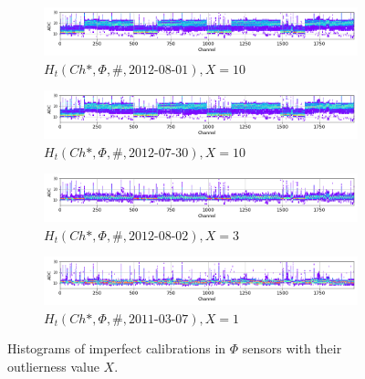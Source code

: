 \begin{figure}

    \begin{subfigure}[b]{\textwidth}
    \centering
    \includegraphics[width=0.9\linewidth]{figures/chapter4/calib_analysis/P2-all-bad-cals-phi-0.png}
    \caption{$H_t(Ch*, \Phi, \#, \text{2012-08-01}), X=10$}
    \label{plot:all-bad-phi-0}
  \end{subfigure}


    \begin{subfigure}[b]{\textwidth}
    \centering
    \includegraphics[width=0.9\linewidth]{figures/chapter4/calib_analysis/P2-all-bad-cals-phi-1.png}
    \caption{$H_t(Ch*, \Phi, \#, \text{2012-07-30}), X=10$}
    \label{plot:all-bad-phi-1}
  \end{subfigure}


    \begin{subfigure}[b]{\textwidth}
    \centering
    \includegraphics[width=0.9\linewidth]{figures/chapter4/calib_analysis/P2-all-bad-cals-phi-2.png}
    \caption{$H_t(Ch*, \Phi, \#, \text{2012-08-02}), X=3$}
    \label{plot:all-bad-phi-2}
  \end{subfigure}


    \begin{subfigure}[b]{\textwidth}
    \centering
    \includegraphics[width=0.9\linewidth]{figures/chapter4/calib_analysis/P2-all-bad-cals-phi-3.png}
    \caption{$H_t(Ch*, \Phi, \#, \text{2011-03-07}), X=1$}
    \label{plot:all-bad-phi-3}
  \end{subfigure}
    \caption{Histograms of imperfect calibrations in $\Phi$ sensors with their outlierness value $X$.}
    \label{plot:all-bad-phi}
\end{figure}


